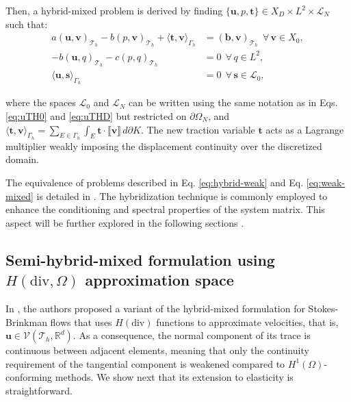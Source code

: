 \documentclass[english,11pt,3p,number,sort&compress]{elsarticle}
\newcommand{\jump}[1]
{
	\llbracket #1 \rrbracket
}
\begin{document}
Then, a hybrid-mixed problem is derived by finding $\{\bm{u},p,\bm{t}\} \in X_D \times L^2 \times \mathcal{L}_N$ such that:
\begin{subequations} \label{eq:hybrid-weak}
	\begin{align}
		a\left(\bm{u},\bm{v}\right)_{\mathcal{T}_h} - b\left( p, \bm{v}\right)_{\mathcal{T}_h} +\langle\bm{t},\bm{v}\rangle_{\Gamma_h} &= \left(\bm{b},\bm{v}\right)_{\mathcal{T}_h} ~~\forall\, \bm{v} \in X_0,\label{eq:hybrid-weak-a}\\ 
		-b\left(\bm{u}, q\right)_{\mathcal{T}_h} - c\left(p,q \right)_{\mathcal{T}_h} &= 0 ~~\forall\, q \in L^2, \label{eq:hybrid-weak-b}\\
		\langle\bm{u},\bm{s}\rangle_{\Gamma_h} &= 0 ~~\forall\, \bm{s} \in \mathcal{L}_0, \label{eq:hybrid-weak-c}
	\end{align}
\end{subequations}

\noindent where the spaces $\mathcal{L}_0$ and $\mathcal{L}_N$ can be written using the same notation as in Eqs. \eqref{eq:uTH0} and \eqref{eq:uTHD} but restricted on $\partial\Omega_N$, and $\langle\bm{t},\bm{v}\rangle_{\Gamma_h}=\sum_{E \in \Gamma_h}\int_{E} \bm{t} \cdot \jump{\bm{v}} \,d\partial K$. The new traction variable $\bm{t}$ acts as a Lagrange multiplier weakly imposing the displacement continuity over the discretized domain.

The equivalence of problems described in Eq. \eqref{eq:hybrid-weak} and Eq. \eqref{eq:weak-mixed} is detailed in \cite{raviart1977primal}. The hybridization technique is commonly employed to enhance the conditioning and spectral properties of the system matrix. This aspect will be further explored in the following sections \cite{arnold1985mixed}.

\subsection{Semi-hybrid-mixed formulation using \(H(\mathrm{div},\Omega)\) approximation space}

In \cite{carvalho2024semi}, the authors proposed a variant of the hybrid-mixed formulation for Stokes-Brinkman flows that uses \(H(\text{div})\) functions to approximate velocities, that is, $\bm{u} \in \mathcal{V}(\mathcal{T}_h,\mathbb{R}^d)$. As a consequence, the normal component of its trace is continuous between adjacent elements, meaning that only the continuity requirement of the tangential component is weakened compared to $H^1(\Omega)$-conforming methods. We show next that its extension to elasticity is straightforward.
\end{document}
